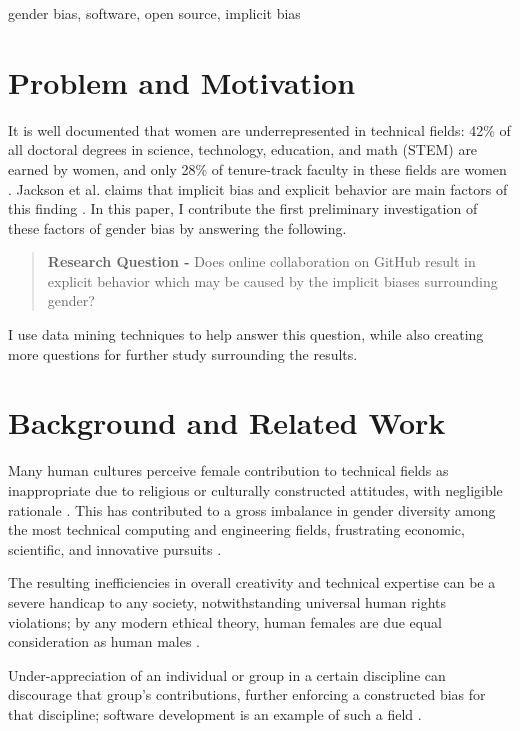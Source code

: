 \documentclass[authoryear]{sigplanconf}
\begin{document}

\keywords
gender bias, software, open source, implicit bias

\section{Problem and Motivation}

It is well documented that women are underrepresented in technical fields:
42\% of all doctoral degrees in science, technology, education, and
math (STEM) are earned by women, and only 28\% of tenure-track faculty in these
fields are women \citep{womenengineering}. Jackson et al. claims that implicit
bias and explicit behavior are main
factors of this finding \citep{implicitbias}. In this paper, I
contribute the first preliminary investigation of these factors of gender bias
by answering the following.

\begin{quote}
  \textbf{Research Question -} Does online collaboration on GitHub result in
  explicit behavior which may be caused by the implicit biases surrounding
  gender?
\end{quote}

I use data mining techniques to help answer this question, while also creating
more questions for further study surrounding the results.

\section{Background and Related Work}

Many human cultures perceive female contribution to technical
fields as inappropriate due to religious or culturally constructed attitudes, with
negligible rationale \citep{elamin2010saudiwomen}. This has contributed to a gross imbalance in gender diversity among
the most technical computing and engineering fields, frustrating economic,
scientific, and innovative pursuits \citep{genderscience}.

The resulting inefficiencies in overall creativity and technical expertise
can be a severe handicap to any society, notwithstanding universal human rights
violations; by any modern ethical theory, human females are due equal
consideration as human males \citep{ethicsgender}.

Under-appreciation of an individual or group in a certain
discipline can discourage that group's contributions, further enforcing a
constructed bias for that discipline; software development is an example of such
a field \citep{genderscience}.
\end{document}
